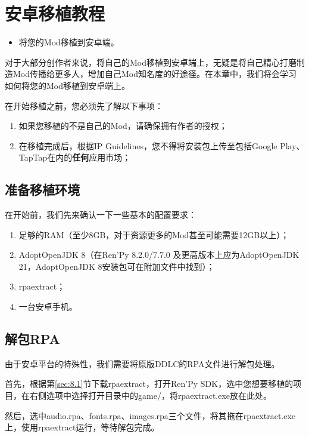 \documentclass[../../Main.tex]{subfiles}
\begin{document}
\chapter{安卓移植教程}
\begin{ChapterGoals}
    \begin{itemize}
        \item 将您的Mod移植到安卓端。
    \end{itemize}
\end{ChapterGoals}


对于大部分创作者来说，将自己的Mod移植到安卓端上，无疑是将自己精心打磨制造Mod传播给更多人，增加自己Mod知名度的好途径。在本章中，我们将会学习如何将您的Mod移植到安卓端上。


\begin{Attention}
    在开始移植之前，您必须先了解以下事项：
    \begin{enumerate}
        \item 如果您移植的不是自己的Mod，请确保拥有作者的授权；
        \item 在移植完成后，根据IP Guidelines，您不得将安装包上传至包括Google Play、TapTap在内的\textbf{任何}应用市场；
    \end{enumerate}
\end{Attention}

\section{准备移植环境}
在开始前，我们先来确认一下一些基本的配置要求：
\begin{enumerate}
    \item 足够的RAM（至少8GB，对于资源更多的Mod甚至可能需要12GB以上）；
    \item AdoptOpenJDK 8（在Ren'Py 8.2.0/7.7.0 及更高版本上应为AdoptOpenJDK 21，AdoptOpenJDK 8安装包可在附加文件中找到）；
    \item rpaextract；
    \item 一台安卓手机。
\end{enumerate}


\section{解包RPA}
由于安卓平台的特殊性，我们需要将原版DDLC的RPA文件进行解包处理。

首先，根据第\ref{sec:8.1}节下载rpaextract，打开Ren'Py SDK，选中您想要移植的项目，在右侧选项中选择打开目录中的game/，将rpaextract.exe放在此处。

然后，选中audio.rpa、fonts.rpa、images.rpa三个文件，将其拖在rpaextract.exe上，使用rpaextract运行，等待解包完成。
\end{document}
